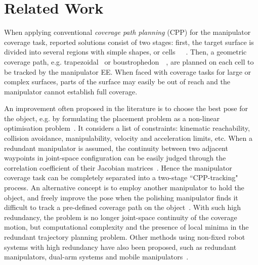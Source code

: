 \documentclass[letterpaper, 10pt, conference]{ieeeconf}
\begin{document}
\section{Related Work}
\label{sectionrelatedwork}
When applying conventional \textit{coverage path planning} (CPP) for the manipulator coverage task, reported solutions consist of two stages: first, the target surface is divided into several regions with simple shapes, or cells~\cite{lumelsky1990dynamic}~\cite{choset2000exact}~\cite{Acar2002Morse}. Then, a geometric coverage path, e.g. trapezoidal~\cite{choset2005principles} or boustrophedon~\cite{choset1998coverage}~\cite{choset2000coverage}, are planned on each cell to be tracked by the manipulator EE. 
When faced with coverage tasks for large or complex surfaces, parts of the surface may easily be out of reach and the manipulator cannot establish full coverage. 

An improvement often proposed in the literature is to choose the best pose for the object, e.g. by formulating the placement problem as a non-linear optimisation problem~\cite{Malhan2019Identifying}. It considers a list of constraints: kinematic reachability, collision avoidance, manipulability, velocity and acceleration limits, etc. 
When a redundant manipulator is assumed, the continuity between two adjacent waypoints in joint-space configuration can be easily judged through the correlation coefficient of their Jacobian matrices~\cite{Chen2002Correlation}. Hence the manipulator coverage task can be completely separated into a two-stage ``CPP-tracking" process. An alternative concept is to employ another manipulator to hold the object, and freely improve the pose when the polishing manipulator finds it difficult to track a pre-defined coverage path on the object~\cite{Kabir2019Generation}. With such high redundancy, the problem is no longer joint-space continuity of the coverage motion, but computational complexity and the presence of local minima in the redundant trajectory planning problem. 
Other methods using non-fixed robot systems with high redundancy have also been  proposed, such as redundant manipulators, dual-arm systems and mobile manipulators~\cite{Atkar2003Towards}. 
\end{document}
